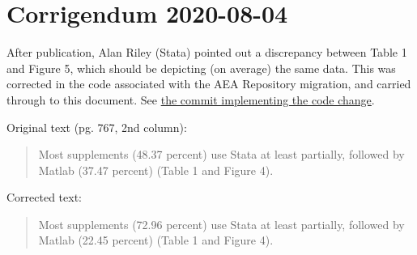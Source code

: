 \documentclass[PP]{AEA}
\begin{document}
\FloatBarrier
%
%



\appendix



\clearpage

\section*{Corrigendum 2020-08-04}

After publication, Alan Riley (Stata) pointed out a discrepancy between Table 1 and Figure 5, which should be depicting (on average) the same data. This was corrected in the code associated with the AEA Repository migration, and carried through to this document. See \href{https://github.com/AEADataEditor/aea-supplement-migration/commit/530f1e9ad8059e68815b5836db33155c990154b0}{the commit implementing the code change}.

Original text (pg. 767, 2nd column):
\begin{quote}
Most supplements (48.37 percent) use Stata at least partially, followed by
Matlab (37.47 percent) (Table 1 and Figure 4).
\end{quote}

Corrected text:
\begin{quote}
Most supplements (72.96 percent) use Stata at least partially, followed by
Matlab (22.45 percent) (Table 1 and Figure 4).
\end{quote}
\end{document}
